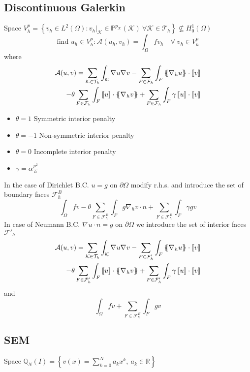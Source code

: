 \documentclass[a4paper,11pt]{article}
\theoremstyle{break}
\renewcommand*{\grad}{\nabla\mspace{1mu}}
\newcommand*{\txt}[1]{\text{#1}}
\renewcommand{\real}{\mathbb{R}}
\newcommand*{\limited}[1]{\vert_{#1}}
\newcommand{\jump}[1]{\left[\!\left[#1\right]\!\right]}
\newcommand{\average}[1]{\left\{\mspace{-6.5mu}\left\{#1\right\}\mspace{-6.5mu}\right\}}
\newcommand{\element}{\mathcal{K}}
\newcommand{\triangulation}{\mathcal{T}_h}
\newcommand{\boundary}{{\partial\Omega}}
\newcommand{\eit}{{\element\in\triangulation}}
\newcommand{\find}{\txt{find }}
\numberwithin{equation}{section}
\begin{document}
\subsection*{Discontinuous Galerkin}
Space \(V^p_h = \left\{ v_h \in L^2(\Omega) : v_h\limited{\element} \in \mathbb{P}^{p_\element}(\element) \ \forall \eit \right\}\not \subseteq H^1_0(\Omega)\)
\[
    \find u_h \in V^p_h : \mathcal{A}(u_h, v_h) = \int_\Omega fv_h \quad \forall \; v_h \in V_h^p
\]
where 
\[
    \begin{split}
        \mathcal{A}(u,v) = \sum_\eit \int_\element \grad u \grad v - \sum_{F \in \mathcal{F}_h} \int_F \average{\grad_h u} \cdot \jump{v} \\
        -\theta \sum_{F \in \mathcal{F}_h} \int_F \jump{u} \cdot \average{\grad_h v} + \sum_{F \in \mathcal{F}_h} \int_F \gamma \jump{u} \cdot \jump{v}
    \end{split}
\]
\begin{itemize}
    \item \(\theta = 1\) Symmetric interior penalty
    \item \(\theta = -1\) Non-symmetric interior penalty
    \item \(\theta = 0\) Incomplete interior penalty
    \item \(\gamma = \alpha \frac{p^2}{h}\)
\end{itemize}
In the case of Dirichlet B.C. \(u = g\) on \(\boundary\) modify r.h.s. and introduce the set of boundary faces \(\mathcal{F}^B_h\)
\[
    \int_\Omega fv - \theta \sum_{F \in \mathcal{F}^B_h} \int_F g \grad_h v \cdot n + \sum_{F \in \mathcal{F}^B_h} \int_F \gamma g v 
\]
In case of Neumann B.C. \(\grad u \cdot n = g\) on \(\boundary\) we introduce the set of interior faces \(\mathcal{F}'_h\)
\[
    \begin{split}
        \mathcal{A}(u,v) = \sum_\eit \int_\element \grad u \grad v - \sum_{F \in \mathcal{F}'_h} \int_F \average{\grad_h u} \cdot \jump{v} \\
        -\theta \sum_{F \in \mathcal{F}'_h} \int_F \jump{u} \cdot \average{\grad_h v} + \sum_{F \in \mathcal{F}'_h} \int_F \gamma \jump{u} \cdot \jump{v}
    \end{split}
\]
and 
\[
    \int_\Omega fv + \sum_{F \in \mathcal{F}^B_h} \int_F g v 
\]
\subsection*{SEM}
Space \(\mathbb{Q}_N(I) = \left\{ v(x) = \sum_{k=0}^{N} a_k x^k, \ a_k \in \real \right\}\)
\end{document}

